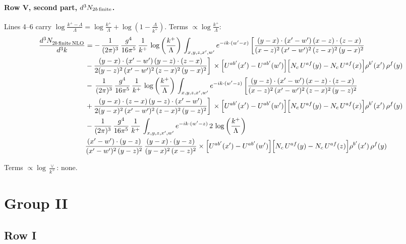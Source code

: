 \documentclass[10pt]{article}
\numberwithin{equation}{section}
\begin{document}
\paragraph{Row V, second part, $d^3N_{2b\,\rm finite}$.}
Lines 4--6 carry $\log\frac{k^+-\Lambda}{\Lambda}=\log\frac{k^+}{\Lambda}+\log(1-\frac{\Lambda}{k^+})$.
\noindent Terms $\propto\log\frac{k^+}{\Lambda}$:
\begin{align}
    \frac{d^{3}N_{2b\,\rm finite\, NLO}^{\rm}}{d^{3}k} & =   -\, \frac{1}{(2\pi)^{3}}\,\frac{g^{4}}{16\pi^{5}}\,\frac{1}{k^{+}}\,\log{\left(\frac{k^{+}}{\Lambda}\right)}\,\int_{x,y,z,x',w'}e^{-ik\cdot(w'-x)}\, \bigg[\frac{(y-x)\cdot (x'-w')\,(x-z)\cdot (z-x)}{(x-z)^{2}\,(x'-w')^{2}\,(z-x)^{2}\,(y-x)^{2}}\notag \\ & -\frac{(y-x)\cdot (x'-w')\,(y-z)\cdot (z-x)}{2(y-z)^{2}\,(x'-w')^{2}\,(z-x)^{2}\,(y-x)^{2}}\bigg]\,\times \Big[U^{ab'}(x')-U^{ab'}(w')\Big]\Big[N_{c}\,U^{af}(y)-N_{c}\,U^{af}(x)\Big]\rho^{b'}(x')\,\rho^{f}(y) \notag \\
& -\, \frac{1}{(2\pi)^{3}}\,\frac{g^{4}}{16\pi^{5}}\,\frac{1}{k^{+}}\,\log{\left(\frac{k^{+}}{\Lambda}\right)}\,\int_{x,y,z,x',w'}e^{-ik\cdot(w'-z)}\,\bigg[\frac{(y-z)\cdot (x'-w')\,(x-z)\cdot (z-x)}{(x-z)^{2}\,(x'-w')^{2}\,(z-x)^{2}\,(y-z)^{2}}\notag \\ & +\frac{(y-x)\cdot (z-x)\,(y-z)\cdot (x'-w')}{2(y-x)^{2}\,(x'-w')^{2}\,(z-x)^{2}\,(y-z)^{2}}\bigg]\,\times \Big[U^{ab'}(x')-U^{ab'}(w')\Big]\Big[N_{c}\,U^{af}(y)-N_{c}\,U^{af}(x)\Big]\rho^{b'}(x')\,\rho^{f}(y) \notag \\
& - \frac{1}{(2\pi)^{3}}\,\frac{g^{4}}{16\pi^{5}}\,\frac{1}{k^{+}}\,\int_{x,y,z,x',w'}e^{-ik\cdot(w'-z)}\,2\,\log{\left(\frac{k^{+}}{\Lambda}\right)}\notag \\ & \frac{(x'-w')\cdot(y-z)}{(x'-w')^{2}\,(y-z)^{2}}\,\frac{(y-x)\cdot(y-z)}{(y-x)^{2}\,(x-z)^{2}}\times\Big[U^{ab'}(x')-U^{ab'}(w')\Big]\Big[N_{c}\,U^{af}(y)-N_{c}\,U^{af}(z)\Big]\rho^{b'}(x')\,\rho^{f}(y) \label{eq:J:G1V2bfin}
\end{align}

\noindent Terms $\propto\log\frac{\vee}{k^+}$: none.

\section{Group II}\label{sec:LLgII}
\subsection{Row I}
\end{document}
